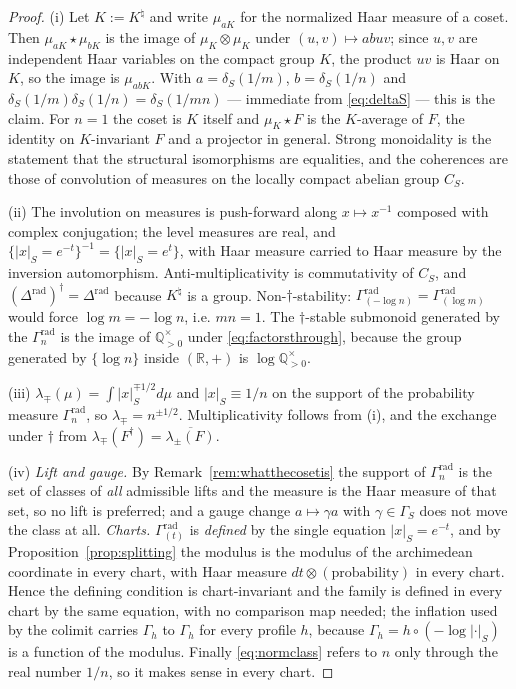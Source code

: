 \documentclass[11pt]{amsart}
\theoremstyle{definition}
\theoremstyle{remark}
\newcommand{\R}{\mathbb R}
\newcommand{\Q}{\mathbb Q}
\newcommand{\Knat}{K^{\natural}}
\begin{document}
\begin{proof}
(i) Let $K:=\Knat$ and write $\mu_{aK}$ for the normalized Haar measure of a
coset. Then $\mu_{aK}\star\mu_{bK}$ is the image of $\mu_K\otimes\mu_K$ under
$(u,v)\mapsto abuv$; since $u,v$ are independent Haar variables on the compact
group $K$, the product $uv$ is Haar on $K$, so the image is $\mu_{abK}$. With
$a=\delta_S(1/m)$, $b=\delta_S(1/n)$ and
$\delta_S(1/m)\delta_S(1/n)=\delta_S(1/mn)$ --- immediate from
\eqref{eq:deltaS} --- this is the claim. For $n=1$ the coset is $K$ itself and
$\mu_K\star F$ is the $K$-average of $F$, the identity on $K$-invariant $F$ and
a projector in general. Strong monoidality is the statement that the structural
isomorphisms are equalities, and the coherences are those of convolution of
measures on the locally compact abelian group $C_S$.

(ii) The involution on measures is push-forward along $x\mapsto x^{-1}$
composed with complex conjugation; the level measures are real, and
$\{|x|_S=e^{-t}\}^{-1}=\{|x|_S=e^{t}\}$, with Haar measure carried to Haar
measure by the inversion automorphism. Anti-multiplicativity is commutativity
of $C_S$, and $(\Delta^{\mathrm{rad}})^\dagger=\Delta^{\mathrm{rad}}$ because
$\Knat$ is a group. Non-$\dagger$-stability:
$\Gamma^{\mathrm{rad}}_{(-\log n)}=\Gamma^{\mathrm{rad}}_{(\log m)}$ would
force $\log m=-\log n$, i.e. $mn=1$. The $\dagger$-stable submonoid generated
by the $\Gamma_n^{\mathrm{rad}}$ is the image of $\Q_{>0}^\times$ under
\eqref{eq:factorsthrough}, because the group generated by $\{\log n\}$ inside
$(\R,+)$ is $\log\Q_{>0}^\times$.

(iii) $\lambda_\mp(\mu)=\int|x|_S^{\mp1/2}d\mu$ and $|x|_S\equiv1/n$ on the
support of the probability measure $\Gamma_n^{\mathrm{rad}}$, so
$\lambda_\mp=n^{\pm1/2}$. Multiplicativity follows from (i), and the exchange
under $\dagger$ from $\lambda_\mp(F^\dagger)=\overline{\lambda_\pm(F)}$.

(iv) \emph{Lift and gauge.} By Remark~\ref{rem:whatthecosetis} the support of
$\Gamma_n^{\mathrm{rad}}$ is the set of classes of \emph{all} admissible lifts
and the measure is the Haar measure of that set, so no lift is preferred; and a
gauge change $a\mapsto\gamma a$ with $\gamma\in\Gamma_S$ does not move the
class at all. \emph{Charts.} $\Gamma^{\mathrm{rad}}_{(t)}$ is \emph{defined} by
the single equation $|x|_S=e^{-t}$, and by Proposition~\ref{prop:splitting} the
modulus is the modulus of the archimedean coordinate in every chart, with Haar
measure $dt\otimes(\text{probability})$ in every chart. Hence the defining
condition is chart-invariant and the family is defined in every chart by the
same equation, with no comparison map needed; the inflation used by the colimit
carries $\Gamma_h$ to $\Gamma_h$ for every profile $h$, because
$\Gamma_h=h\circ(-\log|\cdot|_S)$ is a function of the modulus. Finally
\eqref{eq:normclass} refers to $n$ only through the real number $1/n$, so it
makes sense in every chart.
\end{proof}
\end{document}
